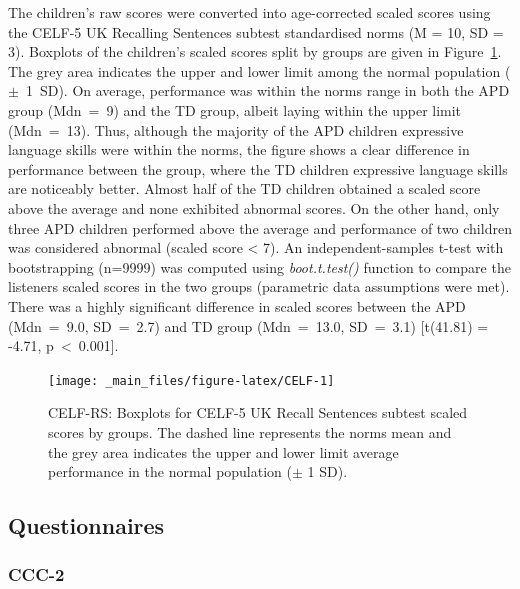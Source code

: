 \documentclass[a4paper, twoside]{templates/ociamthesis}
\begin{document}
The children's raw scores were converted into age-corrected scaled scores using the CELF-5 UK Recalling Sentences subtest standardised norms (M = 10, SD = 3). Boxplots of the children's scaled scores split by groups are given in Figure~\ref{fig:CELF}. The grey area indicates the upper and lower limit among the normal population (\(\pm\)~1~SD). On average, performance was within the norms range in both the APD group (Mdn~=~9) and the TD group, albeit laying within the upper limit (Mdn~=~13). Thus, although the majority of the APD children expressive language skills were within the norms, the figure shows a clear difference in performance between the group, where the TD children expressive language skills are noticeably better. Almost half of the TD children obtained a scaled score above the average and none exhibited abnormal scores. On the other hand, only three APD children performed above the average and performance of two children was considered abnormal (scaled score \textless{} 7). An independent-samples t-test with bootstrapping (n=9999) was computed using \emph{boot.t.test()} function \autocite[MKinfer package;][]{MKinferPackageR} to compare the listeners scaled scores in the two groups (parametric data assumptions were met). There was a highly significant difference in scaled scores between the APD (Mdn~=~9.0, SD~=~2.7) and TD group (Mdn~=~13.0, SD~=~3.1) {[}t(41.81) = -4.71, p~\textless~0.001{]}.\\

\begin{figure}

{\centering \texttt{[image: \_main\_files/figure-latex/CELF-1]} 

}

\caption{CELF-RS: Boxplots for CELF-5 UK Recall Sentences subtest scaled scores by groups. The dashed line represents the norms mean and the grey area indicates the upper and lower limit average performance in the normal population ($\pm$ 1 SD).}\label{fig:CELF}
\end{figure}

\hypertarget{questionnaires-1}{%
\subsection{Questionnaires}\label{questionnaires-1}}

\hypertarget{ccc-2}{%
\subsubsection{CCC-2}\label{ccc-2}}
\end{document}
